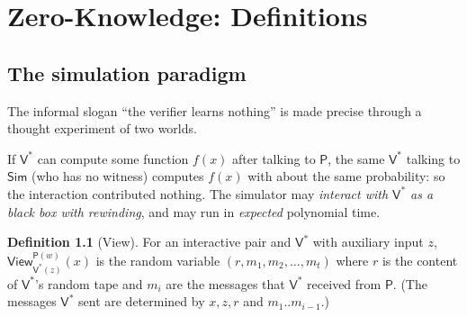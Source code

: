 \documentclass[11pt,a4paper]{report}
\theoremstyle{plain}
\theoremstyle{definition}
\newtheorem{definition}[theorem]{Definition}
\theoremstyle{remark}
\newcommand{\Prv}{\mathsf{P}}\newcommand{\Ver}{\mathsf{V}}
\newcommand{\Sim}{\mathsf{Sim}}\newcommand{\Ext}{\mathsf{Ext}}
\newcommand{\view}{\mathsf{View}}
\begin{document}
\chapter{Zero-Knowledge: Definitions}\label{ch:zk}
\section{The simulation paradigm}
The informal slogan ``the verifier learns nothing'' is made precise through a thought experiment of two worlds.
\begin{center}
\end{center}
If $\Ver^*$ can compute some function $f(x)$ after talking to $\Prv$, the same $\Ver^*$ talking to $\Sim$ (who has no witness) computes $f(x)$ with about the same probability: so the interaction contributed nothing. The simulator may \emph{interact with $\Ver^*$ as a black box with rewinding}, and may run in \emph{expected} polynomial time.

\begin{definition}[View]
For an interactive pair and $\Ver^*$ with auxiliary input $z$, $\view^{\Prv(w)}_{\Ver^*(z)}(x)$ is the random variable $(r,m_1,m_2,\dots,m_t)$ where $r$ is the content of $\Ver^*$'s random tape and $m_i$ are the messages that $\Ver^*$ received from $\Prv$. (The messages $\Ver^*$ sent are determined by $x,z,r$ and $m_1..m_{i-1}$.)
\end{definition}
\end{document}
